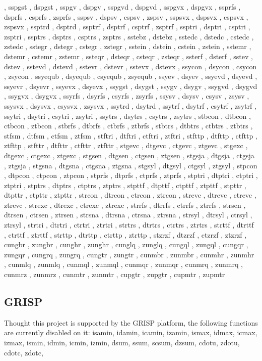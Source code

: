 \documentclass{article}
\begin{document}
, sspgst , dspgst , sspgv , dspgv , sspgvd , dspgvd , sspgvx , dspgvx , ssprfs , dsprfs , csprfs , zsprfs , sspsv , dspsv , cspsv , zspsv , sspsvx , dspsvx , cspsvx , zspsvx , ssptrd , dsptrd , ssptrf , dsptrf , csptrf , zsptrf , ssptri , dsptri , csptri , zsptri , ssptrs , dsptrs , csptrs , zsptrs , sstebz , dstebz , sstedc , dstedc , cstedc , zstedc , sstegr , dstegr , cstegr , zstegr , sstein , dstein , cstein , zstein , sstemr , dstemr , cstemr , zstemr , ssteqr , dsteqr , csteqr , zsteqr , ssterf , dsterf , sstev , dstev , sstevd , dstevd , sstevr , dstevr , sstevx , dstevx , ssycon , dsycon , csycon , zsycon , ssyequb , dsyequb , csyequb , zsyequb , ssyev , dsyev , ssyevd , dsyevd , ssyevr , dsyevr , ssyevx , dsyevx , ssygst , dsygst , ssygv , dsygv , ssygvd , dsygvd , ssygvx , dsygvx , ssyrfs , dsyrfs , csyrfs , zsyrfs , ssysv , dsysv , csysv , zsysv , ssysvx , dsysvx , csysvx , zsysvx , ssytrd , dsytrd , ssytrf , dsytrf , csytrf , zsytrf , ssytri , dsytri , csytri , zsytri , ssytrs , dsytrs , csytrs , zsytrs , stbcon , dtbcon , ctbcon , ztbcon , stbrfs , dtbrfs , ctbrfs , ztbrfs , stbtrs , dtbtrs , ctbtrs , ztbtrs , stfsm , dtfsm , ctfsm , ztfsm , stftri , dtftri , ctftri , ztftri , stfttp , dtfttp , ctfttp , ztfttp , stfttr , dtfttr , ctfttr , ztfttr , stgevc , dtgevc , ctgevc , ztgevc , stgexc , dtgexc , ctgexc , ztgexc , stgsen , dtgsen , ctgsen , ztgsen , stgsja , dtgsja , ctgsja , ztgsja , stgsna , dtgsna , ctgsna , ztgsna , stgsyl , dtgsyl , ctgsyl , ztgsyl , stpcon , dtpcon , ctpcon , ztpcon , stprfs , dtprfs , ctprfs , ztprfs , stptri , dtptri , ctptri , ztptri , stptrs , dtptrs , ctptrs , ztptrs , stpttf , dtpttf , ctpttf , ztpttf , stpttr , dtpttr , ctpttr , ztpttr , strcon , dtrcon , ctrcon , ztrcon , strevc , dtrevc , ctrevc , ztrevc , strexc , dtrexc , ctrexc , ztrexc , strrfs , dtrrfs , ctrrfs , ztrrfs , strsen , dtrsen , ctrsen , ztrsen , strsna , dtrsna , ctrsna , ztrsna , strsyl , dtrsyl , ctrsyl , ztrsyl , strtri , dtrtri , ctrtri , ztrtri , strtrs , dtrtrs , ctrtrs , ztrtrs , strttf , dtrttf , ctrttf , ztrttf , strttp , dtrttp , ctrttp , ztrttp , stzrzf , dtzrzf , ctzrzf , ztzrzf , cungbr , zungbr , cunghr , zunghr , cunglq , zunglq , cungql , zungql , cungqr , zungqr , cungrq , zungrq , cungtr , zungtr , cunmbr , zunmbr , cunmhr , zunmhr , cunmlq , zunmlq , cunmql , zunmql , cunmqr , zunmqr , cunmrq , zunmrq , cunmrz , zunmrz , cunmtr , zunmtr , cupgtr , zupgtr , cupmtr , zupmtr 

\subsection{GRISP}
Thought this project is supported by the GRISP platform, the following functions are currently disabled on it:
isamin, idamin, icamin, izamin, ismax, idmax, icmax, izmax, ismin, idmin, icmin, izmin, dsum, ssum, scsum, dzsum, cdotu, zdotu, cdotc, zdotc, 
\end{document}
